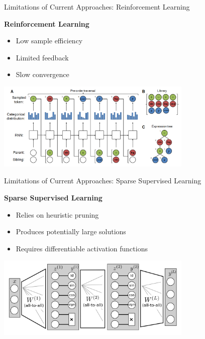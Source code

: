 \documentclass[aspectratio=1610]{beamer}
\begin{document}
    \begin{frame}{Limitations of Current Approaches: Reinforcement Learning}

        \begin{center}
            \textbf{Reinforcement Learning}
            \begin{itemize}
                \item Low sample efficiency
                \item Limited feedback
                \item Slow convergence
            \end{itemize}
            \includegraphics[width=0.7\textwidth]{figs/DSR.png}
        \end{center}
    \end{frame}

    \begin{frame}{Limitations of Current Approaches: Sparse Supervised Learning}

        \begin{center}
            \textbf{Sparse Supervised Learning}
            \begin{itemize}
                \item Relies on heuristic pruning
                \item Produces potentially large solutions
                \item Requires differentiable activation functions
            \end{itemize}
            \includegraphics[width=0.7\textwidth]{figs/EQL.png}
        \end{center}
    \end{frame}
\end{document}

